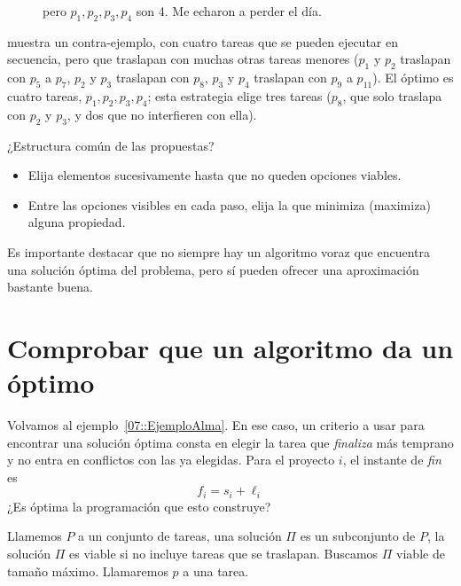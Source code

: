 \begin{example}
\begin{description}
\begin{figure}[ht]
{                 pero \(p_1, p_2, p_3, p_4\) son \num{4}.
                 Me echaron a perder el día.}
        \label{07::Tareas4}
      \end{figure}
      muestra un contra-ejemplo,
      con cuatro tareas que se pueden ejecutar en secuencia,
      pero que traslapan con muchas otras tareas menores
      (\(p_1\) y \(p_2\) traslapan con \(p_5\) a \(p_7\),
       \(p_2\) y \(p_3\) traslapan con \(p_8\),
       \(p_3\) y \(p_4\) traslapan con \(p_9\) a \(p_{11}\)).
      El óptimo es cuatro tareas,
      \(p_1, p_2, p_3, p_4\);
      esta estrategia elige tres tareas
      (\(p_8\),
       que solo traslapa con \(p_2\) y \(p_3\),
       y dos que no interfieren con ella).
    \end{description}
  \end{example}
  ¿Estructura común de las propuestas?
  \begin{itemize}
  \item
    Elija elementos sucesivamente hasta que no queden opciones viables.
  \item
    Entre las opciones visibles en cada paso,
    elija la que minimiza (maximiza) alguna propiedad.
  \end{itemize}
  Es importante destacar que no siempre hay un algoritmo voraz
  que encuentra una solución óptima del problema,
  pero sí pueden ofrecer una aproximación bastante buena.

\section{Comprobar que un algoritmo da un óptimo}

  Volvamos al ejemplo~\ref{07::EjemploAlma}.
  En ese caso,
  un criterio a usar para encontrar una solución óptima
  consta en elegir la tarea que \emph{finaliza} más temprano
  y no entra en conflictos con las ya elegidas.
  Para el proyecto \(i\),
  el instante de \emph{fin} es
  \begin{equation*}
    f_i
      = s_i + \ell _i
  \end{equation*}
  ¿Es óptima la programación que esto construye?

   Llamemos \(P\) a un conjunto de tareas,
  una solución \(\Pi\) es un subconjunto de \(P\),
  la solución \(\Pi\) es viable si no incluye tareas que se traslapan.
  Buscamos \(\Pi\) viable de tamaño máximo.
  Llamaremos \(p\) a una tarea.

